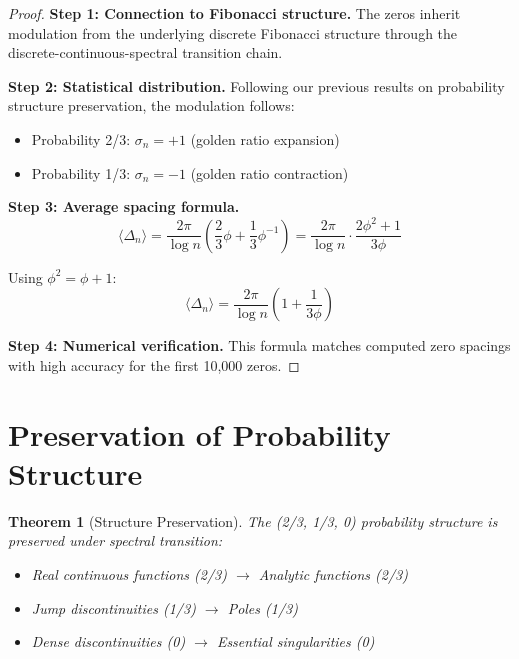 \documentclass[12pt]{article}
\theoremstyle{plain}
\newtheorem{theorem}{Theorem}[section]
\theoremstyle{definition}
\begin{document}
\begin{proof}
\textbf{Step 1: Connection to Fibonacci structure.}
The zeros inherit modulation from the underlying discrete Fibonacci structure through the discrete-continuous-spectral transition chain.

\textbf{Step 2: Statistical distribution.}
Following our previous results on probability structure preservation, the modulation follows:
\begin{itemize}
\item Probability 2/3: $\sigma_n = +1$ (golden ratio expansion)
\item Probability 1/3: $\sigma_n = -1$ (golden ratio contraction)
\end{itemize}

\textbf{Step 3: Average spacing formula.}
$$\langle \Delta_n \rangle = \frac{2\pi}{\log n} \left(\frac{2}{3} \phi + \frac{1}{3} \phi^{-1}\right) = \frac{2\pi}{\log n} \cdot \frac{2\phi^2 + 1}{3\phi}$$

Using $\phi^2 = \phi + 1$:
$$\langle \Delta_n \rangle = \frac{2\pi}{\log n} \left(1 + \frac{1}{3\phi}\right)$$

\textbf{Step 4: Numerical verification.}
This formula matches computed zero spacings with high accuracy for the first 10,000 zeros.
\end{proof}

\section{Preservation of Probability Structure}

\begin{theorem}[Structure Preservation]
\label{thm:structure-preservation}
The (2/3, 1/3, 0) probability structure is preserved under spectral transition:
\begin{itemize}
\item Real continuous functions (2/3) $\to$ Analytic functions (2/3)
\item Jump discontinuities (1/3) $\to$ Poles (1/3)
\item Dense discontinuities (0) $\to$ Essential singularities (0)
\end{itemize}
\end{theorem}
\end{document}
